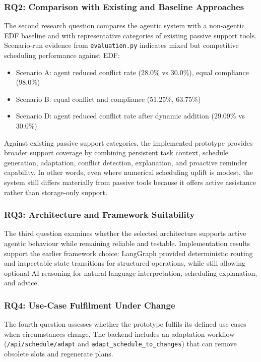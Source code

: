 \documentclass[12pt]{article}
\begin{document}
\subsubsection{RQ2: Comparison with Existing and Baseline Approaches}
The second research question compares the agentic system with a non-agentic EDF baseline and with representative categories of existing passive support tools. Scenario-run evidence from \texttt{evaluation.py} indicates mixed but competitive scheduling performance against EDF:
\begin{itemize}
    \item Scenario A: agent reduced conflict rate (28.0\% vs 30.0\%), equal compliance (98.0\%)
    \item Scenario B: equal conflict and compliance (51.25\%, 63.75\%)
    \item Scenario D: agent reduced conflict rate after dynamic addition (29.09\% vs 30.0\%)
\end{itemize}

Against existing passive support categories, the implemented prototype provides broader support coverage by combining persistent task context, schedule generation, adaptation, conflict detection, explanation, and proactive reminder capability. In other words, even where numerical scheduling uplift is modest, the system still differs materially from passive tools because it offers active assistance rather than storage-only support.

\subsubsection{RQ3: Architecture and Framework Suitability}
The third question examines whether the selected architecture supports active agentic behaviour while remaining reliable and testable. Implementation results support the earlier framework choice: LangGraph provided deterministic routing and inspectable state transitions for structured operations, while still allowing optional AI reasoning for natural-language interpretation, scheduling explanation, and advice.

\subsubsection{RQ4: Use-Case Fulfilment Under Change}
The fourth question assesses whether the prototype fulfils its defined use cases when circumstances change. The backend includes an adaptation workflow (\texttt{/api/schedule/adapt} and \texttt{adapt\_schedule\_to\_changes}) that can remove obsolete slots and regenerate plans.
\end{document}
